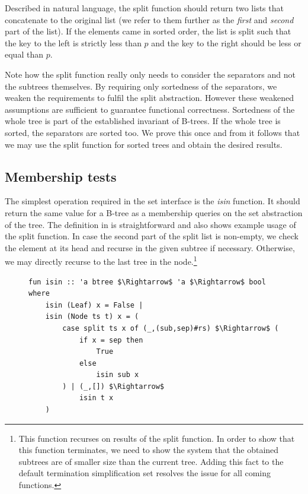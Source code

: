 Described in natural language, the split function should return two lists
that concatenate to the original list
(we refer to them further as the \textit{first} and \textit{second} part of the list).
If the elements came in sorted order,
the list is split such that the key to the left is strictly
less than $p$ and the key to the right
should be less or equal than $p$.

Note how the split function really only needs to
consider the separators and not the subtrees themselves.
By requiring only sortedness of the separators,
we weaken the requirements to fulfil the split abstraction.
However these weakened assumptions are sufficient to guarantee
functional correctness.
Sortedness of the whole tree is part of the established invariant of B-trees.
If the whole tree is sorted, the separators are sorted too.
We prove this once and from it follows that
we may use the split function for sorted trees
and obtain the desired results.

\subsection{Membership tests}

The simplest operation required in the set interface is
the \textit{isin} function.
It should return the same value for a B-tree 
as a membership queries on the set abstraction of the tree.
The definition in  is straightforward 
and also shows example usage of the split function.
In case the second part of the split list is non-empty,
we check the element at its head and recurse in the given subtree
if necessary.
Otherwise, we may directly recurse to the last tree in the node.\footnote{
    This function recurses on results of the split function.
    In order to show that this function terminates, we need to show
    the system that the obtained subtrees are of smaller size than the current tree.
    Adding this fact to the default termination simplification set resolves
    the issue for all coming functions.
}

\begin{figure}
\begin{lstlisting}[mathescape=true, language=Isabelle, caption=The \textit{isin} function, label=lst:isin-fun]
fun isin :: 'a btree $\Rightarrow$ 'a $\Rightarrow$ bool where
    isin (Leaf) x = False |
    isin (Node ts t) x = (
        case split ts x of (_,(sub,sep)#rs) $\Rightarrow$ (
            if x = sep then
                True
            else
                isin sub x
        ) | (_,[]) $\Rightarrow$
            isin t x
    )
\end{lstlisting}
\end{figure}

